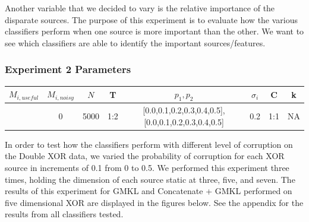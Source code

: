 \documentclass{article}
\begin{document}
Another variable that we decided to vary is the relative importance of the disparate sources. The purpose of this experiment is to evaluate how the various classifiers perform when one source is more important than the other. We want to see which classifiers are able to identify the important sources/features.

\subsubsection*{Experiment 2 Parameters}
\begin{center}
\begin{tabular}{|c|c|c|c|c|c|c|c|}
\hline
$M_{i,useful}$ & $M_{i, noisy}$ & $N$ & T &  $p_1, p_2$ & $\sigma_i$ & C &  k  \\
\hline
[3,5,7] & 0 & 5000 & 1:2 & [0.0,0.1,0.2,0.3,0.4,0.5],[0.0,0.1,0.2,0.3,0.4,0.5] & 0.2 & 1:1 & NA  \\
\hline
\end{tabular}
\end{center}



In order to test how the classifiers perform with different level of corruption on the Double XOR data, we varied the probability of corruption for each XOR source in increments of 0.1 from 0 to 0.5. We performed this experiment three times, holding the dimension of each source static at three, five, and seven. The results of this experiment for GMKL and Concatenate + GMKL performed on five dimensional XOR are displayed in the figures below. See the appendix for the results from all classifiers tested.
\end{document}
